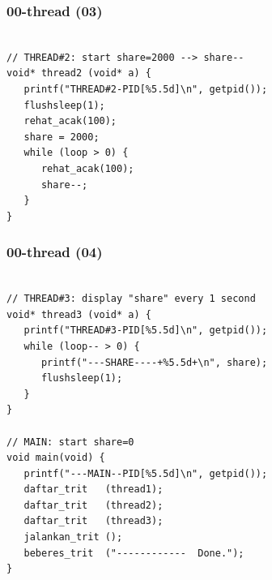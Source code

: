 \documentclass[xcolor=table, notheorems, hyperref={pdfpagelabels=false}]{beamer}
\begin{document}
\begin{frame}[fragile]
\frametitle{00-thread (03)}
\begin{lstlisting}[basicstyle=\ttfamily\large]        %  54

// THREAD#2: start share=2000 --> share--
void* thread2 (void* a) {
   printf("THREAD#2-PID[%5.5d]\n", getpid());
   flushsleep(1);
   rehat_acak(100);
   share = 2000;
   while (loop > 0) {
      rehat_acak(100);
      share--;
   }
}

\end{lstlisting}
\end{frame}

\begin{frame}[fragile]
\frametitle{00-thread (04)}
\begin{lstlisting}[basicstyle=\ttfamily\small]        %  65
% \begin{lstlisting}[basicstyle=\ttfamily\large]        %  54

// THREAD#3: display "share" every 1 second
void* thread3 (void* a) {
   printf("THREAD#3-PID[%5.5d]\n", getpid());
   while (loop-- > 0) {
      printf("---SHARE----+%5.5d+\n", share);
      flushsleep(1);
   }
}

// MAIN: start share=0
void main(void) {
   printf("---MAIN--PID[%5.5d]\n", getpid());
   daftar_trit   (thread1);
   daftar_trit   (thread2);
   daftar_trit   (thread3);
   jalankan_trit ();
   beberes_trit  ("------------  Done.");
}

\end{lstlisting}
\end{frame}
\end{document}
